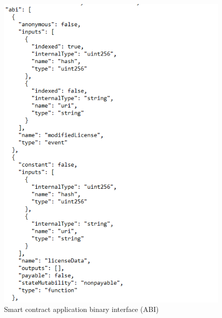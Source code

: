 \begin{center}
	\begin{figure}[htb!]
		
		\begin{minipage}{0.45\linewidth}
			\centering
			\includegraphics[width=1.95\textwidth]{images/chap02_SmartContract_ABI.png}
		\end{minipage}
		\caption[Smart contract application binary interface (ABI)]{Smart contract application binary interface (ABI) \cite{Third}}
		
	\end{figure}
	
\end{center}